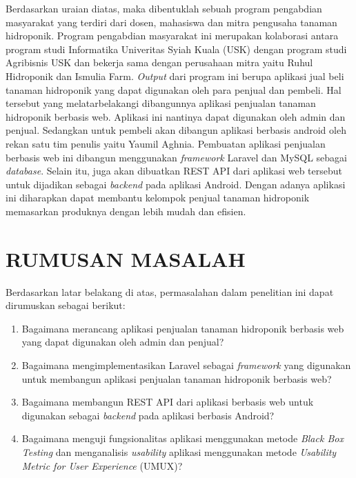 \par Berdasarkan uraian diatas, maka dibentuklah sebuah program pengabdian masyarakat yang terdiri dari dosen, mahasiswa dan mitra pengusaha tanaman hidroponik. Program pengabdian masyarakat ini merupakan kolaborasi antara program studi Informatika Univeritas Syiah Kuala (USK) dengan program studi Agribisnis USK dan bekerja sama dengan perusahaan mitra yaitu Ruhul Hidroponik dan Ismulia Farm. \textit{Output} dari program ini berupa aplikasi jual beli tanaman hidroponik yang dapat digunakan oleh para penjual dan pembeli. Hal tersebut yang melatarbelakangi dibangunnya aplikasi penjualan tanaman hidroponik berbasis web. Aplikasi ini nantinya dapat digunakan oleh admin dan penjual. Sedangkan untuk pembeli akan dibangun aplikasi berbasis android oleh rekan satu tim penulis yaitu Yaumil Aghnia. Pembuatan aplikasi penjualan berbasis web ini dibangun menggunakan \textit{framework} Laravel dan MySQL sebagai \textit{database}. Selain itu, juga akan dibuatkan REST API dari aplikasi web tersebut untuk dijadikan sebagai \textit{backend} pada aplikasi Android. Dengan adanya aplikasi ini diharapkan dapat membantu kelompok penjual tanaman hidroponik memasarkan produknya dengan lebih mudah dan efisien.

\fancyhf{} 
\fancyfoot[R]{\thepage}

\section{\uppercase{RUMUSAN MASALAH}}
Berdasarkan latar belakang di atas, permasalahan dalam penelitian ini dapat dirumuskan sebagai berikut:
\begin{enumerate}
	\item Bagaimana merancang aplikasi penjualan tanaman hidroponik berbasis web yang dapat digunakan oleh admin dan penjual?
	\item Bagaimana mengimplementasikan Laravel sebagai \textit{framework} yang digunakan untuk membangun aplikasi penjualan tanaman hidroponik berbasis web?
	\item Bagaimana membangun REST API dari aplikasi berbasis web untuk digunakan sebagai \textit{backend}  pada aplikasi berbasis Android?
	\item Bagaimana menguji fungsionalitas aplikasi menggunakan metode \textit{Black Box Testing} dan menganalisis \textit{usability} aplikasi menggunakan metode \textit{Usability Metric for User Experience} (UMUX)?
\end{enumerate}

